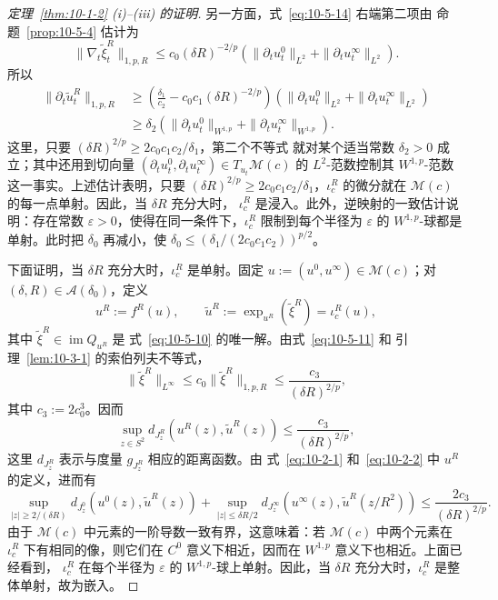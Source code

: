 \begin{proof}[定理~\ref{thm:10-1-2} (i)--(iii) 的证明]
另一方面，式~\eqref{eq:10-5-14} 右端第二项由
命题~\ref{prop:10-5-4} 估计为
\[
  \|\nabla_t\widetilde\xi_t^R\|_{1,p,R}
  \le c_0(\delta R)^{-2/p}
  \left(
    \|\partial_tu_t^0\|_{L^2}
    +\|\partial_tu_t^\infty\|_{L^2}
  \right).
\]
所以
\[
\begin{aligned}
  \|\partial_t\widetilde u_t^R\|_{1,p,R}
  &\ge\left(\frac{\delta_1}{c_2}
      -c_0c_1(\delta R)^{-2/p}\right)
    \left(
      \|\partial_tu_t^0\|_{L^2}
      +\|\partial_tu_t^\infty\|_{L^2}
    \right)\\
  &\ge\delta_2\left(
      \|\partial_tu_t^0\|_{W^{1,p}}
      +\|\partial_tu_t^\infty\|_{W^{1,p}}
    \right).
\end{aligned}
\]
这里，只要 $(\delta R)^{2/p}\ge2c_0c_1c_2/\delta_1$，第二个不等式
就对某个适当常数 $\delta_2>0$ 成立；其中还用到切向量
$(\partial_tu_t^0,\partial_tu_t^\infty)\in T_{u_t}\mathcal M(c)$ 的
$L^2$-范数控制其 $W^{1,p}$-范数这一事实。上述估计表明，只要
$(\delta R)^{2/p}\ge2c_0c_1c_2/\delta_1$，$\iota_c^R$ 的微分就在
$\mathcal M(c)$ 的每一点单射。因此，当 $\delta R$ 充分大时，
$\iota_c^R$ 是浸入。此外，逆映射的一致估计说明：存在常数
$\varepsilon>0$，使得在同一条件下，$\iota_c^R$ 限制到每个半径为
$\varepsilon$ 的 $W^{1,p}$-球都是单射。此时把 $\delta_0$ 再减小，使
$\delta_0\le(\delta_1/(2c_0c_1c_2))^{p/2}$。

下面证明，当 $\delta R$ 充分大时，$\iota_c^R$ 是单射。固定
$u:=(u^0,u^\infty)\in\mathcal M(c)$；对
$(\delta,R)\in\mathcal A(\delta_0)$，定义
\begin{equation}\label{eq:10-5-16}
  u^R:=f^R(u),
  \qquad
  \widetilde u^R:=\exp_{u^R}(\widetilde\xi^R)=\iota_c^R(u),
\end{equation}
其中 $\widetilde\xi^R\in\operatorname{im}Q_{u^R}$ 是
式~\eqref{eq:10-5-10} 的唯一解。由式~\eqref{eq:10-5-11} 和
引理~\ref{lem:10-3-1} 的索伯列夫不等式，
\[
  \|\widetilde\xi^R\|_{L^\infty}
  \le c_0\|\widetilde\xi^R\|_{1,p,R}
  \le\frac{c_3}{(\delta R)^{2/p}},
\]
其中 $c_3:=2c_0^3$。因而
\begin{equation}\label{eq:10-5-17}
  \sup_{z\in S^2}d_{J_z^R}(u^R(z),\widetilde u^R(z))
  \le\frac{c_3}{(\delta R)^{2/p}},
\end{equation}
这里 $d_{J_z^R}$ 表示与度量 $g_{J_z^R}$ 相应的距离函数。由
式~\eqref{eq:10-2-1} 和~\eqref{eq:10-2-2} 中 $u^R$ 的定义，进而有
\begin{equation}\label{eq:10-5-18}
  \sup_{|z|\ge2/(\delta R)}d_{J_z^0}(u^0(z),\widetilde u^R(z))
  +\sup_{|z|\le\delta R/2}
    d_{J_z^\infty}(u^\infty(z),\widetilde u^R(z/R^2))
  \le\frac{2c_3}{(\delta R)^{2/p}}.
\end{equation}
由于 $\mathcal M(c)$ 中元素的一阶导数一致有界，这意味着：若
$\mathcal M(c)$ 中两个元素在 $\iota_c^R$ 下有相同的像，则它们在
$C^0$ 意义下相近，因而在 $W^{1,p}$ 意义下也相近。上面已经看到，
$\iota_c^R$ 在每个半径为 $\varepsilon$ 的 $W^{1,p}$-球上单射。因此，当
$\delta R$ 充分大时，$\iota_c^R$ 是整体单射，故为嵌入。


\end{proof}
